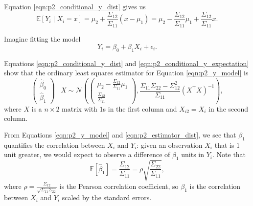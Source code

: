 \documentclass[letterpaper,11pt]{article}
\begin{document}
\begin{enumerate}
\begin{enumerate}
\begin{description}
      Equation \ref{eqn:p2_conditional_y_dist} gives us
      \begin{equation}
        \mathbb{E}\left[Y_i \mid X_i = x\right] =
        \mu_2 + \frac{\Sigma_{12}}{\Sigma_{11}}\left(x - \mu_1\right)
        = \mu_2 - \frac{\Sigma_{12}}{\Sigma_{11}}\mu_1 + \frac{\Sigma_{12}}{\Sigma_{11}}x.
        \label{eqn:p2_conditional_y_expectation}
      \end{equation}

      Imagine fitting the model
      \begin{equation}
        Y_{i} = \beta_0 + \beta_1X_i + \epsilon_i.
        \label{eqn:p2_y_model}
      \end{equation}

      Equations \ref{eqn:p2_conditional_y_dist} and
      \ref{eqn:p2_conditional_y_expectation} show that the ordinary least
      squares estimator for Equation \ref{eqn:p2_y_model} is
      \begin{equation}
        \begin{pmatrix}
          \hat{\beta}_0 \\
          \hat{\beta}_1
        \end{pmatrix}
        \mid X
        \sim \mathcal{N}\left(
        \begin{pmatrix}
          \mu_2 - \frac{\Sigma_{12}}{\Sigma_{11}}\mu_1 \\
          \frac{\Sigma_{12}}{\Sigma_{11}}
        \end{pmatrix},
        \frac{\Sigma_{11}\Sigma_{22} - \Sigma_{12}^2}{\Sigma_{11}}
        \left(X^\intercal X\right)^{-1}
      \right),
      \label{eqn:p2_estimator_dist}
    \end{equation}
    where $X$ is a $n \times 2$ matrix with $1$s in the first column and
    $X_{i2} = X_i$ in the second column.

    From Equations \ref{eqn:p2_y_model} and \ref{eqn:p2_estimator_dist}, we see
    that $\beta_1$ quantifies the correlation between $X_i$ and $Y_i$: given an
    observation $X_i$ that is $1$ unit greater, we would expect to observe a
    difference of $\beta_1$ units in $Y_i$. Note that
    \begin{equation}
      \mathbb{E}\left[\hat{\beta}_1\right] = \frac{\Sigma_{12}}{\Sigma_{11}}
      = \rho\sqrt{\frac{\Sigma_{22}}{\Sigma_{11}}},      
    \end{equation}
    where $\rho = \frac{\Sigma_{12}}{\sqrt{\Sigma_{11}\Sigma_{22}}}$ is the
    Pearson correlation coefficient, so $\beta_1$ is the correlation between
    $X_i$ and $Y_i$ scaled by the standard errors.


\end{description}
\end{enumerate}
\end{enumerate}
\end{document}
